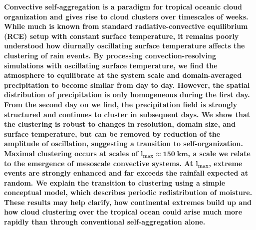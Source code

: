\documentclass[draft,linenumbers]{agujournal2019}
\begin{document}
\noindent
{\bf
Convective self-aggregation is a paradigm for tropical oceanic cloud organization and gives rise to cloud clusters over timescales of weeks. While much is known from standard radiative-convective equilibrium (RCE) setup with constant surface temperature, it remains poorly understood how diurnally oscillating surface temperature affects the clustering of rain events. 
By processing convection-resolving simulations with oscillating surface temperature, we find the atmosphere to equilibrate at the system scale and domain-averaged precipitation to become similar from day to day. However, the spatial distribution of precipitation is only homogeneous during the first day. 
From the second day on we find, the precipitation field is strongly structured and continues to cluster in subsequent days.
We show that the clustering is robust to changes in resolution, domain size, and surface temperature, but can be removed by reduction of the amplitude of oscillation, suggesting a transition to self-organization. Maximal clustering occurs at scales of $\mathbf{l_{max}\approx 150\;km}$, a scale we relate to the emergence of mesoscale convective systems. 
At $\mathbf{l_{max}}$, extreme events are strongly enhanced and far exceeds the rainfall expected at random. 
We explain the transition to clustering using a simple conceptual model, which describes periodic redistribution of moisture. 
These results may help clarify, how continental extremes build up and how cloud clustering over the tropical ocean could arise much more rapidly than through conventional self-aggregation alone.
}
\end{document}
